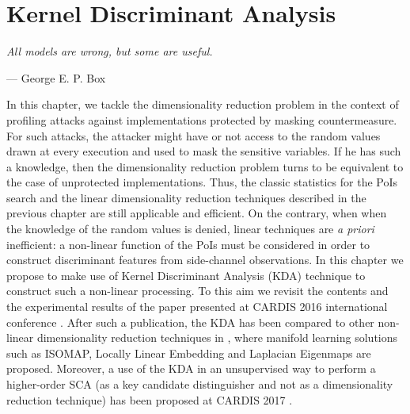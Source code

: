 
\chapter{Kernel Discriminant Analysis} %
\label{ChapterKernel}
\setlength{\epigraphwidth}{0.3\textwidth}
\epigraph{\textit{All models are wrong, but some are useful.}}{--- \textup{George E. P. Box}}


In this chapter, we tackle the dimensionality reduction problem in the context of profiling attacks against implementations protected by masking countermeasure. For such attacks, the attacker might have or not access to the  random values drawn at every execution and used to mask the sensitive variables. If he has such a knowledge, then the dimensionality reduction problem turns to be equivalent to the case of unprotected implementations. Thus, the classic statistics for the PoIs search and the linear dimensionality reduction techniques described in the previous chapter are still applicable and efficient. On the contrary, when when the knowledge of the random values is denied, linear techniques are \emph{a priori} inefficient: a non-linear function of the PoIs must be considered in order to construct discriminant features from side-channel observations. In this chapter we propose to make use of Kernel Discriminant Analysis (KDA) technique to construct such a non-linear processing. To this aim we revisit the contents and the experimental results of the paper presented at CARDIS 2016 international conference \cite{cagli2016kernel}. After such a publication, the KDA has been compared to other non-linear dimensionality reduction techniques in \cite{manifold}, where manifold learning solutions such as ISOMAP, Locally Linear Embedding and Laplacian Eigenmaps are proposed. Moreover, a use of the KDA in an unsupervised way to perform a higher-order SCA (as a key candidate distinguisher and not as a dimensionality reduction technique) has been proposed at CARDIS 2017 \cite{zhou2017novel}.



